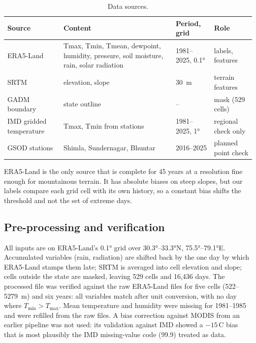 \documentclass[11pt,a4paper]{article}
\begin{document}
\begin{table}[H]
\centering\small
\caption{Data sources.}\label{tab:sources}
\begin{tabular}{@{}l p{5.2cm} l l@{}}
\toprule
Source & Content & Period, grid & Role \\
\midrule
ERA5-Land~\cite{munoz2021era5land} & Tmax, Tmin, Tmean, dewpoint, humidity, pressure, soil moisture,
  rain, solar radiation & 1981--2025, \ang{0.1} & labels, features \\
SRTM & elevation, slope & \SI{30}{m} & terrain features \\
GADM boundary & state outline & -- & mask (529 cells) \\
IMD gridded temperature & Tmax, Tmin from stations & 1981--2025, \ang{1} & regional check only \\
GSOD stations & Shimla, Sundernagar, Bhuntar & 2016--2025 & planned point check \\
\bottomrule
\end{tabular}
\end{table}

ERA5-Land is the only source that is complete for 45 years at a resolution fine enough for mountainous
terrain. It has absolute biases on steep slopes, but our labels compare each grid cell with its own
history, so a constant bias shifts the threshold and not the set of extreme days.

\subsection{Pre-processing and verification}
All inputs are on ERA5-Land's \ang{0.1} grid over \ang{30.3}--\ang{33.3}N, \ang{75.5}--\ang{79.1}E.
Accumulated variables (rain, radiation) are shifted back by the one day by which ERA5-Land stamps them
late; SRTM is averaged into cell elevation and slope; cells outside the state are masked, leaving 529 cells
and 16{,}436 days. The processed file was verified against the raw ERA5-Land files for five cells
(522--\SI{5279}{m}) and six years: all variables match after unit conversion, with no day where
$T_{\min}>T_{\max}$. Mean temperature and humidity were missing for 1981--1985 and were refilled from the
raw files. A bias correction against MODIS from an earlier pipeline was not used: its validation against
IMD showed a $-15$\,\textdegree C bias that is most plausibly the IMD missing-value code (99.9) treated as
data.

\end{document}
